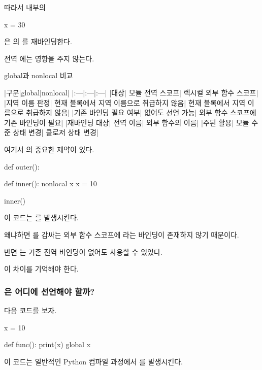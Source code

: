 따라서  내부의

\begin{dhkcode}
x = 30
\end{dhkcode}

은 의 를 재바인딩한다.

전역 에는 영향을 주지 않는다.

\begin{dhknote}
\begin{dhksmry}[centered]
global과 nonlocal 비교
\end{dhksmry}
\end{dhknote}

\begin{dhktable}
|구분|global|nonlocal|
|:---|:---|:---|
|대상|	모듈 전역 스코프|	렉시컬 외부 함수 스코프|
|지역 이름 판정|	현재 블록에서 지역 이름으로 취급하지 않음|	현재 블록에서 지역 이름으로 취급하지 않음|
|기존 바인딩 필요 여부|	없어도 선언 가능|	외부 함수 스코프에 기존 바인딩이 필요|
|재바인딩 대상|	전역 이름|	외부 함수의 이름|
|주된 활용|	모듈 수준 상태 변경|	클로저 상태 변경|
\end{dhktable}

여기서 의 중요한 제약이 있다.

\begin{dhkcode}
def outer():

    def inner():
        nonlocal x
        x = 10

    inner()
\end{dhkcode}

이 코드는 를 발생시킨다.

왜냐하면 를 감싸는 외부 함수 스코프에 라는 바인딩이 존재하지 않기 때문이다.

반면 는 기존 전역 바인딩이 없어도 사용할 수 있었다.

이 차이를 기억해야 한다.

\subsubsection{은 어디에 선언해야 할까?}

다음 코드를 보자.

\begin{dhkcode}
x = 10

def func():
    print(x)
    global x
\end{dhkcode}

이 코드는 일반적인 Python 컴파일 과정에서 를 발생시킨다.

